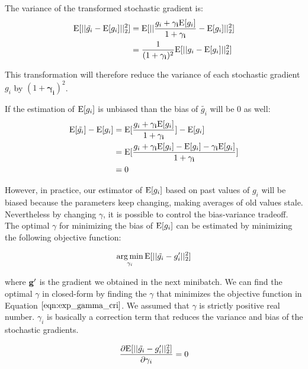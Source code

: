 \documentclass{article}
\begin{document}
The variance of the transformed stochastic gradient is:
\begin{align}
\mathrm{E}[||\tilde{g_i}-\mathrm{E}[g_i]||^2_2] &= \mathrm{E}[||\frac{g_i+\mathbf{\gamma_i}\mathrm{E}[g_i]}{1+\mathbf{\gamma_i}}-\mathrm{E}[g_i]||^2_2] \\
&= \frac{1}{(1+\mathbf{\gamma_i})^2}\mathrm{E}[||g_i-\mathrm{E}[g_i]||^2_2]
\end{align}

This transformation will therefore reduce the variance of each stochastic gradient
$g_i$  by $(1+\mathbf{\gamma_i})^2$.

If the estimation of $\mathrm{E}[g_i]$ is unbiased than the bias of $\tilde{g_i}$ will be $0$ as well:
\begin{align}
\mathrm{E}[\tilde{g_i}]-\mathrm{E}[g_i] &= \mathrm{E}[\frac{g_i+\mathbf{\gamma_i}\mathrm{E}[g_i]}{1+\mathbf{\gamma_i}}]-\mathrm{E}[g_i] \\
 &= \mathrm{E}[\frac{g_i+\mathbf{\gamma_i}\mathrm{E}[g_i] - \mathrm{E}[g_i] - \mathbf{\gamma_i}\mathrm{E}[g_i]}{1+\mathbf{\gamma_i}}] \\
 &= 0
\end{align}

However, in practice, our estimator of $\mathrm{E}[g_i]$ based on past values of $g_i$ 
will be biased because the parameters keep changing,
making averages of old values stale.
Nevertheless by changing $\gamma$, it is possible to control the bias-variance tradeoff. 
The optimal $\gamma$ for minimizing the bias of $\mathrm{E}[g_i]$ can be estimated 
by minimizing the following objective function:

\begin{equation}
\label{eqn:exp_gamma_cri}
\operatorname*{arg\,min}_{\gamma_i} \mathrm{E}[||\tilde{g_i} - g_i^{\prime}||^2_2]
\end{equation}

where $\mathbf{g}^{\prime}$ is the gradient we obtained in the next minibatch. 
We can find the optimal $\gamma$ in closed-form by finding the $\gamma$ that minimizes the
objective function in Equation $\ref{eqn:exp_gamma_cri}$. We assumed that $\gamma$ is strictly
positive real number. $\gamma_i$ is basically a correction term that reduces the variance and bias of the
stochastic gradients.

\begin{equation}
\label{eqn:exp_gamma_opt}
\frac{\partial \mathrm{E}[||\tilde{g_i} - g_i^{\prime}||^2_2]}{\partial \gamma_i}=0
\end{equation}
\end{document}

